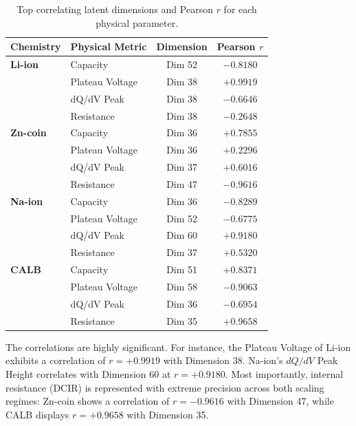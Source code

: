 \documentclass[a4paper,fleqn]{cas-dc}
\begin{document}
\begin{table}[t]
\caption{Top correlating latent dimensions and Pearson $r$ for each physical parameter.}
\label{tbl:correlations}
\centering
\small
\begin{tabular}{llcc}
\toprule
Chemistry & Physical Metric & Dimension & Pearson $r$ \\
\midrule
\textbf{Li-ion} & Capacity & Dim 52 & $-0.8180$ \\
& Plateau Voltage & Dim 38 & $+0.9919$ \\
& dQ/dV Peak & Dim 38 & $-0.6646$ \\
& Resistance & Dim 38 & $-0.2648$ \\
\midrule
\textbf{Zn-coin} & Capacity & Dim 36 & $+0.7855$ \\
& Plateau Voltage & Dim 36 & $+0.2296$ \\
& dQ/dV Peak & Dim 37 & $+0.6016$ \\
& Resistance & Dim 47 & $-0.9616$ \\
\midrule
\textbf{Na-ion} & Capacity & Dim 36 & $-0.8289$ \\
& Plateau Voltage & Dim 52 & $-0.6775$ \\
& dQ/dV Peak & Dim 60 & $+0.9180$ \\
& Resistance & Dim 37 & $+0.5320$ \\
\midrule
\textbf{CALB} & Capacity & Dim 51 & $+0.8371$ \\
& Plateau Voltage & Dim 58 & $-0.9063$ \\
& dQ/dV Peak & Dim 36 & $-0.6954$ \\
& Resistance & Dim 35 & $+0.9658$ \\
\bottomrule
\end{tabular}
\end{table}

The correlations are highly significant. For instance, the Plateau Voltage of Li-ion exhibits a correlation of $r = +0.9919$ with Dimension 38. Na-ion's $dQ/dV$ Peak Height correlates with Dimension 60 at $r = +0.9180$. Most importantly, internal resistance (DCIR) is represented with extreme precision across both scaling regimes: Zn-coin shows a correlation of $r = -0.9616$ with Dimension 47, while CALB displays $r = +0.9658$ with Dimension 35.
\end{document}
